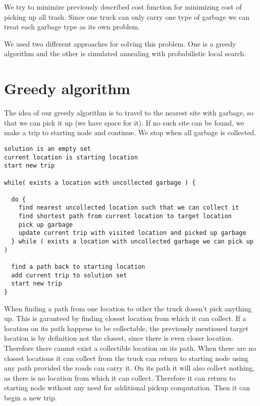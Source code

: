 \documentclass[a4paper, 12pt]{article}
\begin{document}
We try to minimize previously described cost function for minimizing cost of
picking up all trash. Since one truck can only carry one type of garbage we
can treat each garbage type as its own problem.

We used two different approaches for solving this problem. One is a greedy
algorithm and the other is simulated annealing with probabilistic local search.

\section{Greedy algorithm}

The idea of our greedy algorithm is to travel to the nearest site with garbage,
so that we can pick it up (we have space for it). If no such site can be found,
we make a trip to starting node and continue. We stop when all garbage is
collected.

\begin{lstlisting}[basicstyle=\small]
solution is an empty set
current location is starting location
start new trip

while( exists a location with uncollected garbage ) {

  do {
    find nearest uncollected location such that we can collect it
    find shortest path from current location to target location
    pick up garbage
    update current trip with visited location and picked up garbage
  } while ( exists a location with uncollected garbage we can pick up )

  find a path back to starting location
  add current trip to solution set
  start new trip
}
\end{lstlisting}

When finding a path from one location to other the truck doesn't pick anything
up. This is garanteed by finding closest location from which it can collect. If
a location on its path happens to be collectable, the previously mentioned
target location is by definition not the closest, since there is even closer
location. Therefore there cannot exist a collectible location on
its path. When there are no closest locations it can collect from the truck can
return to starting node using any path provided the roads can carry it. On its
path it will also collect nothing, as there is no location from which it can
collect. Therefore it can return to starting node without any need for
additional pickup computation. Then it can begin a new trip.
\end{document}
